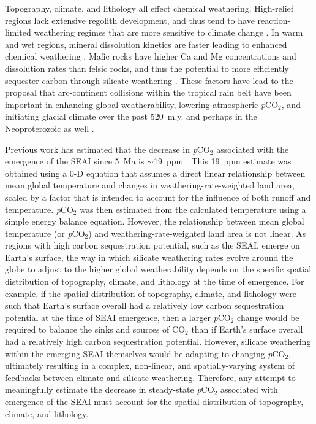 \documentclass[9pt,twocolumn,twoside,lineno]{pnas-new}
\newcommand{\pCOtwo}{\textit{p}CO$_{2}$\xspace}
\newcommand{\COtwo}{CO$_{2}$\xspace}
\begin{document}
Topography, climate, and lithology all effect chemical weathering. High-relief regions lack extensive regolith development, and thus tend to have reaction-limited weathering regimes that are more sensitive to climate change \cite{Gabet2009a, West2012a}. In warm and wet regions, mineral dissolution kinetics are faster leading to enhanced chemical weathering \cite{West2012a}. Mafic rocks have higher Ca and Mg concentrations and dissolution rates than felsic rocks, and thus the potential to more efficiently sequester carbon through silicate weathering \cite{Dessert2003a}. These factors have lead to the proposal that arc-continent collisions within the tropical rain belt have been important in enhancing global weatherability, lowering atmospheric \pCOtwo, and initiating glacial climate over the past 520~m.y. \cite{Jagoutz2016a, Swanson-Hysell2017a, Macdonald2019a} and perhaps in the Neoproterozoic as well \cite{Park2019b}.

Previous work has estimated that the decrease in \pCOtwo associated with the emergence of the SEAI since 5~Ma is $\sim$19~ppm \cite{Molnar2015a}. This 19~ppm estimate was obtained using a 0-D equation that assumes a direct linear relationship between mean global temperature and changes in weathering-rate-weighted land area, scaled by a factor that is intended to account for the influence of both runoff and temperature. \pCOtwo was then estimated from the calculated temperature using a simple energy balance equation. However, the relationship between mean global temperature (or \pCOtwo) and weathering-rate-weighted land area is not linear. As regions with high carbon sequestration potential, such as the SEAI, emerge on Earth's surface, the way in which silicate weathering rates evolve around the globe to adjust to the higher global weatherability depends on the specific spatial distribution of topography, climate, and lithology at the time of emergence. For example, if the spatial distribution of topography, climate, and lithology were such that Earth's surface overall had a relatively low carbon sequestration potential at the time of SEAI emergence, then a larger \pCOtwo change would be required to balance the sinks and sources of \COtwo than if Earth's surface overall had a relatively high carbon sequestration potential. However, silicate weathering within the emerging SEAI themselves would be adapting to changing \pCOtwo, ultimately resulting in a complex, non-linear, and spatially-varying system of feedbacks between climate and silicate weathering. Therefore, any attempt to meaningfully estimate the decrease in steady-state \pCOtwo associated with emergence of the SEAI must account for the spatial distribution of topography, climate, and lithology.
\end{document}
